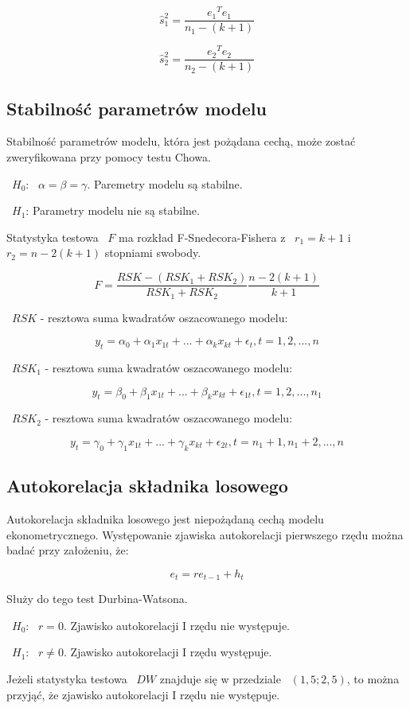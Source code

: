 \documentclass{article}
\begin{document}
\[\hat{s}_1^2 = \frac{{e_1}^T{e_1}}{n_1-(k+1)}\]

\[\hat{s}_2^2 = \frac{{e_2}^T{e_2}}{n_2-(k+1)}\]

\newpage
\subsection{Stabilność parametrów modelu}
Stabilność parametrów modelu, która jest pożądana cechą, może zostać zweryfikowana przy pomocy testu Chowa.

~$H_0$: ~$\alpha = \beta = \gamma$. Paremetry modelu są stabilne.

~$H_1$: Parametry modelu nie są stabilne.

Statystyka testowa ~$F$ ma rozkład F-Snedecora-Fishera z ~$r_1 = k+1$ i ~$r_2 = n - 2(k + 1)$ stopniami swobody.

\[F = \frac{RSK - (RSK_1 + RSK_2)}{RSK_1 + RSK_2}\frac{n - 2(k+1)}{k + 1}\]

~$RSK$ - resztowa suma kwadratów oszacowanego modelu:

\[y_t = \alpha_0 + \alpha_1x_{1t}+...+\alpha_kx_{kt}+\epsilon_t,t=1,2,...,n\]

~$RSK_1$ - resztowa suma kwadratów oszacowanego modelu:

\[y_t = \beta_0 + \beta_1x_{1t}+...+\beta_kx_{kt}+\epsilon_{1t},t=1,2,...,n_1\]

~$RSK_2$ - resztowa suma kwadratów oszacowanego modelu:

\[y_t = \gamma_0 + \gamma_1x_{1t}+...+\gamma_kx_{kt}+\epsilon_{2t},t=n_1+1,n_1+2,...,n\]

\subsection{Autokorelacja składnika losowego}
Autokorelacja składnika losowego jest niepożądaną cechą modelu ekonometrycznego. Występowanie zjawiska autokorelacji pierwszego rzędu można badać przy założeniu, że:

\[e_t = re_{t-1}+h_t\]

Służy do tego test Durbina-Watsona.

~$H_0$: ~$r=0$. Zjawisko autokorelacji I rzędu nie występuje.

~$H_1$: ~$r\neq0$. Zjawisko autokorelacji I rzędu występuje.

Jeżeli statystyka testowa ~$DW$ znajduje się w przedziale ~$(1,5; 2,5)$, to można przyjąć, że zjawisko autokorelacji I rzędu nie występuje.
\end{document}
